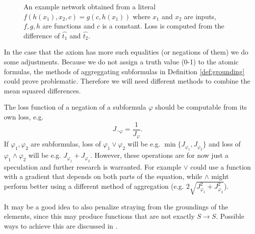 \begin{figure}
\caption{An example network obtained from a literal $f(h(x_1),x_2,c)=g(c,h(x_1))$ where $x_1$ and $x_2$ are inputs, $f,g,h$ are functions and $c$ is a constant. Loss is computed from the difference of $\widehat{t_1}$ and $\widehat{t_2}$.}
\centering
\label{nndiagram2}
\end{figure}

In the case that the axiom has more such equalities (or negations of them) we do some adjustments. Because we do not assign a truth value (0-1) to the atomic formulas, the methods of aggreggating subformulas in Definition \autoref{def:grounding} could prove problematic. Therefore we will need different methods to combine the mean squared differences.

The loss function of a negation of a subformula $\varphi$ should be computable from its own loss, e.g. $$J_{\neg\varphi}=\frac{1}{J_{\varphi}}.$$ If $\varphi_1,\varphi_2$ are subformulas, loss of $\varphi_1\vee \varphi_2$ will be e.g. $\min\{J_{\varphi_1},J_{\varphi_2}\}$ and loss of $\varphi_1\wedge \varphi_2$ will be e.g. $J_{\varphi_1}+J_{\varphi_2}$. However, these operations are for now just a speculation and further research is warranted. For example $\vee$ could use a function with a gradient that depends on both parts of the equation, while $\wedge$ might perform better using a different method of aggregation (e.g. $2\sqrt{J_{\varphi_1}^2+J_{\varphi_2}^2}$).

It may be a good idea to also penalize straying from the groundings of the elements, since this may produce functions that are not exactly $S\rightarrow S$. Possible ways to achieve this are discussed in .

